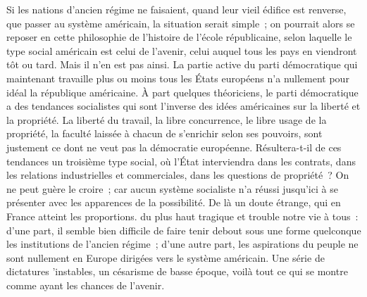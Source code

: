 \documentclass[french,twoside]{book} %
\begin{document}
Si les nations d’ancien régime ne faisaient, quand leur vieil édifice est renverse, que passer au système américain, la situation serait simple ; on pourrait alors se reposer en cette philosophie de l’histoire de l’école républicaine, selon laquelle le type social américain est celui de l’avenir, celui auquel tous les pays en viendront tôt ou tard. Mais il n’en est pas ainsi. La partie active du parti démocratique qui maintenant travaille plus ou moins tous les États européens n’a nullement pour idéal la république américaine. À part quelques théoriciens, le parti démocratique a des tendances socialistes qui sont l’inverse des idées américaines sur la liberté et la propriété. La liberté du travail, la libre concurrence, le libre usage de la propriété, la faculté laissée à chacun de s’enrichir selon ses pouvoirs, sont justement ce dont ne veut pas la démocratie européenne. Résultera-t-il de ces tendances un troisième type social, où l’État interviendra dans les contrats, dans les relations industrielles et commerciales, dans les questions de propriété ? On ne peut guère le croire ; car aucun système socialiste n’a réussi jusqu’ici à se présenter avec les apparences de la possibilité. De là un doute étrange, qui en France atteint les proportions. du plus haut tragique et trouble notre vie à tous : d’une part, il semble bien difficile de faire tenir debout sous une forme quelconque les institutions de l’ancien régime ; d’une autre part, les aspirations du peuple ne sont nullement en Europe dirigées vers le système américain. Une série de dictatures ’instables, un césarisme de basse époque, voilà tout ce qui se montre comme ayant les chances de l’avenir.\par
\end{document}
